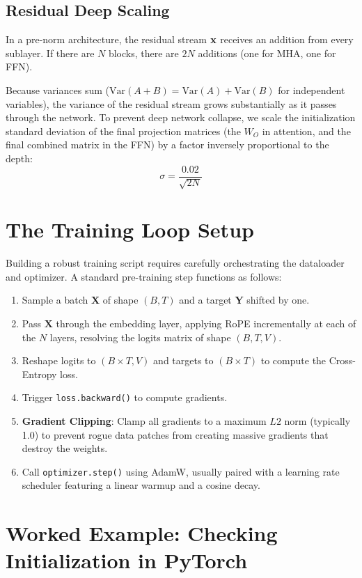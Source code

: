 \subsection{Residual Deep Scaling}
In a pre-norm architecture, the residual stream $\mathbf{x}$ receives an addition from every sublayer. If there are $N$ blocks, there are $2N$ additions (one for MHA, one for FFN).

Because variances sum ($\text{Var}(A+B) = \text{Var}(A) + \text{Var}(B)$ for independent variables), the variance of the residual stream grows substantially as it passes through the network. To prevent deep network collapse, we scale the initialization standard deviation of the final projection matrices (the $W_O$ in attention, and the final combined matrix in the FFN) by a factor inversely proportional to the depth:
\begin{equation}
\sigma = \frac{0.02}{\sqrt{2N}}
\end{equation}

\section{The Training Loop Setup}

Building a robust training script requires carefully orchestrating the dataloader and optimizer. A standard pre-training step functions as follows:
\begin{enumerate}
    \item Sample a batch $\mathbf{X}$ of shape $(B, T)$ and a target $\mathbf{Y}$ shifted by one.
    \item Pass $\mathbf{X}$ through the embedding layer, applying RoPE incrementally at each of the $N$ layers, resolving the logits matrix of shape $(B, T, V)$.
    \item Reshape logits to $(B \times T, V)$ and targets to $(B \times T)$ to compute the Cross-Entropy loss.
    \item Trigger \texttt{loss.backward()} to compute gradients.
    \item \textbf{Gradient Clipping}: Clamp all gradients to a maximum $L2$ norm (typically 1.0) to prevent rogue data patches from creating massive gradients that destroy the weights.
    \item Call \texttt{optimizer.step()} using AdamW, usually paired with a learning rate scheduler featuring a linear warmup and a cosine decay.
\end{enumerate}

\section{Worked Example: Checking Initialization in PyTorch}
\label{ch:12:sec:example}

